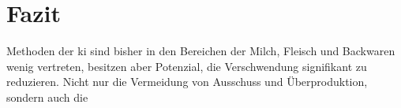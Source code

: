 \section{Fazit}
Methoden der \ac{ki} sind bisher in den Bereichen der Milch, Fleisch und Backwaren wenig vertreten, besitzen aber Potenzial, die Verschwendung signifikant zu reduzieren. Nicht nur die Vermeidung von Ausschuss und Überproduktion, sondern auch die 